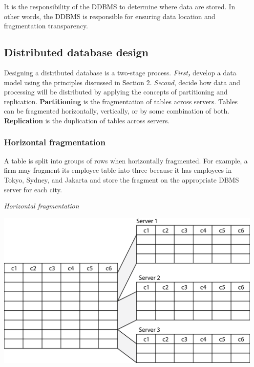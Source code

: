 \documentclass[
]{article}
\begin{document}
It is the responsibility of the DDBMS to determine where data are
stored. In other words, the DDBMS is responsible for ensuring data
location and fragmentation transparency.

\hypertarget{distributed-database-design}{%
\subsection*{Distributed database design}\label{distributed-database-design}}

Designing a distributed database is a two-stage process. \emph{First\textbf{,}}
develop a data model using the principles discussed in Section 2.
\emph{Second}, decide how data and processing will be distributed by applying
the concepts of partitioning and replication. \textbf{Partitioning} is the
fragmentation of tables across servers. Tables can be fragmented
horizontally, vertically, or by some combination of both.
\textbf{Replication} is the duplication of tables across servers.

\hypertarget{horizontal-fragmentation}{%
\subsubsection*{Horizontal fragmentation}\label{horizontal-fragmentation}}

A table is split into groups of rows when horizontally fragmented. For
example, a firm may fragment its employee table into three because it
has employees in Tokyo, Sydney, and Jakarta and store the fragment on
the appropriate DBMS server for each city.

\emph{Horizontal fragmentation}

\includegraphics{Figures/Chapter 21/frag-horizontal.png}
\end{document}
